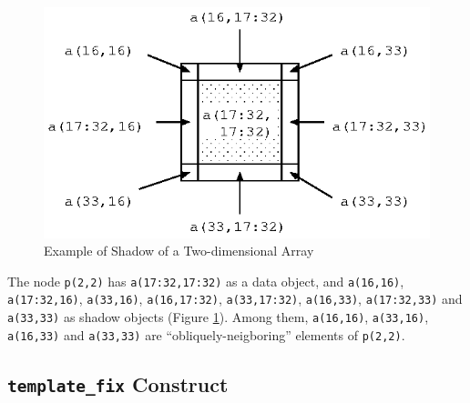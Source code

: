 \begin{minipage}{0.5\hsize}
\begin{center}
\end{center}
\end{minipage}
%
\hspace{0.5cm}
%
\begin{minipage}{0.4\hsize}
\begin{figure}[H]
\begin{center}
\includegraphics[width=\hsize]{figs/fig3.1.eps}
\end{center}
\caption{Example of Shadow of a Two-dimensional Array}
\label{fig3.1}
\end{figure}
\end{minipage}

\vspace{0.5cm}

The node {\tt p(2,2)} has {\tt a(17:32,17:32)} as a data object, and
{\tt a(16,16)}, {\tt a(17:32,16)}, {\tt a(33,16)}, {\tt a(16,17:32)},
{\tt a(33,17:32)}, {\tt a(16,33)}, {\tt a(17:32,33)} and {\tt a(33,33)}
as shadow objects (Figure \ref{fig3.1}). Among them, {\tt a(16,16)},
{\tt a(33,16)}, {\tt a(16,33)} and {\tt a(33,33)} are
``obliquely-neigboring'' elements of {\tt p(2,2)}.


\subsection{{\tt template\_fix} Construct}
\label{subsec:template_fix directive}

